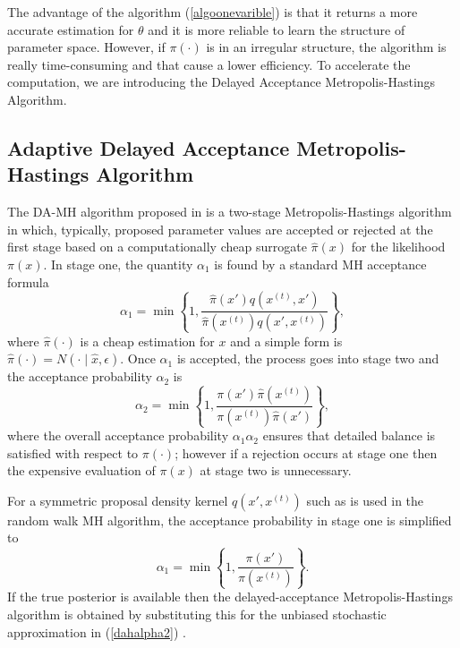 The advantage of the algorithm (\ref{algoonevarible}) is that it returns a more accurate estimation for $\theta$ and it is more reliable to learn the structure of parameter space. However, if $\pi(\cdot)$ is in an irregular structure, the algorithm is really time-consuming and that cause a lower efficiency. To accelerate the computation, we are introducing the Delayed Acceptance Metropolis-Hastings Algorithm.





\subsection{Adaptive Delayed Acceptance Metropolis-Hastings Algorithm}

The DA-MH algorithm proposed in \cite{christen2005markov} is a two-stage Metropolis-Hastings algorithm in which, typically, proposed parameter values are accepted or rejected at the first stage based on a computationally cheap surrogate $\hat{\pi}(x)$ for the likelihood $\pi(x)$. In stage one, the quantity $\alpha_1$ is found by a standard MH acceptance formula 
\begin{equation*}
\alpha_1=\min\left\lbrace  1,\frac{\hat{\pi}(x')q(x^{(t)}, x')}{\hat{\pi}(x^{(t)})q(x', x^{(t)})}  \right\rbrace ,
\end{equation*}
where $\hat{\pi}(\cdot)$ is a cheap estimation for $x$ and a simple form is $\hat{\pi}(\cdot)=N(\cdot\mid \hat{x},\epsilon)$. Once $\alpha_1$ is accepted, the process goes into stage two and the acceptance probability $\alpha_2$ is
\begin{equation}\label{dahalpha2}
\alpha_2=\min \left\lbrace  1,\frac{\pi(x')\hat{\pi}(x^{(t)}) }{\pi(x^{(t)})\hat{\pi}(x')} \right\rbrace,
\end{equation}
where the overall acceptance probability $\alpha_1\alpha_2$ ensures that detailed balance is satisfied with respect to $\pi(\cdot)$; however if a rejection occurs at stage one then the expensive evaluation of $\pi(x)$ at stage two is unnecessary.

For a symmetric proposal density kernel $q(x', x^{(t)})$ such as is used in the random walk MH algorithm, the acceptance probability in stage one is simplified to
\begin{equation} \label{dahalpha1}
\alpha_1= \min \left\lbrace 1,\frac{\pi(x')  }{\pi(x^{(t)}) }  \right\rbrace.
\end{equation}
If the true posterior is available then the delayed-acceptance Metropolis-Hastings algorithm is obtained by substituting this for the unbiased stochastic approximation in (\ref{dahalpha2}) \cite{sherlock2015efficiency}.


